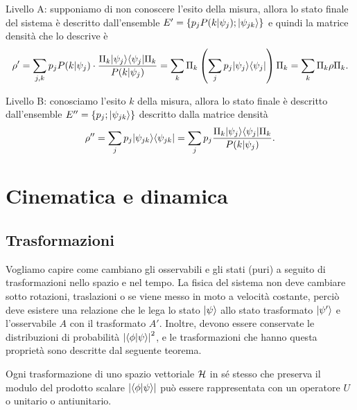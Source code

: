 Livello A: supponiamo di non conoscere l'esito della misura, allora lo stato finale del sistema è descritto dall'ensemble 
$ E'= \{p_j P(k|\psi_j); \vert \psi_{jk} \rangle\} $ e quindi la matrice densità che lo descrive è
\begin{align*}
  \rho' = \sum_{j,k} p_j P(k | \psi_j) \cdot \frac{\Pi_k \vert \psi_j \rangle \langle \psi_j \vert \Pi_k }{P(k|\psi_j)} 
  = \sum_k \Pi_k \left( \sum_j p_j \vert \psi_j \rangle \langle \psi_j \vert \right) \Pi_k = \sum_k \Pi_k \rho \Pi_k.
\end{align*}

Livello B: conosciamo l'esito $ k $ della misura, allora lo stato finale è descritto dall'ensemble $ E'' = \{p_j; \vert \psi_{jk} \rangle\} $ descritto dalla 
matrice densità 
\begin{align*}
  \rho'' = \sum_j p_j \vert \psi_{jk} \rangle \langle \psi_{jk} \vert = \sum_j p_j \frac{\Pi_k \vert \psi_j \rangle \langle \psi_j \vert \Pi_k }{P(k|\psi_j)}.
\end{align*}

\chapter{Cinematica e dinamica}

\section{Trasformazioni}
Vogliamo capire come cambiano gli osservabili e gli stati (puri) a seguito di trasformazioni nello spazio e nel tempo. La fisica del sistema non 
deve cambiare sotto rotazioni, traslazioni o se viene messo in moto a velocità costante, perciò deve esistere una relazione che le lega lo stato 
$ \vert \psi \rangle $ allo stato trasformato $ \vert \psi' \rangle $ e l'osservabile $ A $ con il trasformato $ A' $. Inoltre, devono essere conservate le distribuzioni 
di probabilità $ \abs{ \bk{\phi | \psi}}^2 $, e le trasformazioni che hanno questa proprietà sono descritte dal seguente teorema.

\begin{theorem}[ di Wigner ]
  Ogni trasformazione di uno spazio vettoriale $ \operatorname{\mathcal{H}} $ in sé stesso che preserva il modulo del prodotto scalare $ \abs{\bk{\phi | \psi}} $ può essere 
  rappresentata con un operatore $ U $ o unitario o antiunitario.
\end{theorem}

